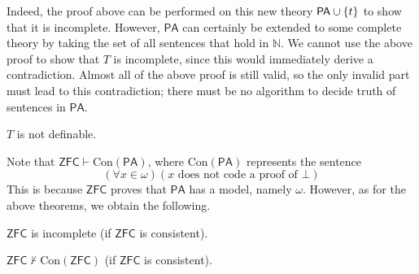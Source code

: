 Indeed, the proof above can be performed on this new theory \( \mathsf{PA} \cup \qty{t} \) to show that it is incomplete.
However, \( \mathsf{PA} \) can certainly be extended to some complete theory by taking the set of all sentences that hold in \( \mathbb N \).
We cannot use the above proof to show that \( T \) is incomplete, since this would immediately derive a contradiction.
Almost all of the above proof is still valid, so the only invalid part must lead to this contradiction; there must be no algorithm to decide truth of sentences in \( \mathsf{PA} \).
\begin{theorem}
    \( T \) is not definable.
\end{theorem}
Note that \( \mathsf{ZFC} \vdash \mathrm{Con}(\mathsf{PA}) \), where \( \mathrm{Con}(\mathsf{PA}) \) represents the sentence
\[ (\forall x \in \omega)(x \text{ does not code a proof of } \bot) \]
This is because \( \mathsf{ZFC} \) proves that \( \mathsf{PA} \) has a model, namely \( \omega \).
However, as for the above theorems, we obtain the following.
\begin{theorem}
    \( \mathsf{ZFC} \) is incomplete (if \( \mathsf{ZFC} \) is consistent).
\end{theorem}
\begin{theorem}
    \( \mathsf{ZFC} \not\vdash \mathrm{Con}(\mathsf{ZFC}) \) (if \( \mathsf{ZFC} \) is consistent).
\end{theorem}
